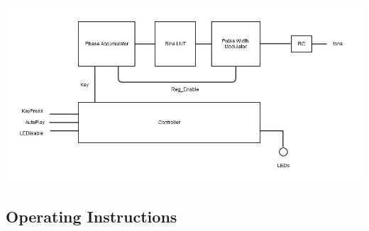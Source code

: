 \documentclass{article}
\begin{document}
    \vspace{-1.15em}
    \includegraphics[width=5.5in]{img/basicblock.jpg}

  \doublespacing
  \subsection{Operating Instructions}

\end{document}
